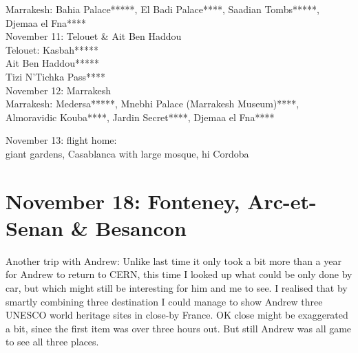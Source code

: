 Marrakesh: Bahia Palace*****, El Badi Palace****, Saadian Tombs*****, Djemaa el Fna****\\

November 11: Telouet \& Ait Ben Haddou\\
Telouet: Kasbah*****\\
Ait Ben Haddou*****\\
Tizi N'Tichka Pass****\\

November 12: Marrakesh\\
Marrakesh: Medersa*****, Mnebhi Palace (Marrakesh Museum)****, Almoravidic Kouba****, Jardin Secret****, Djemaa el Fna****

November 13: flight home:\\
giant gardens, Casablanca with large mosque, hi Cordoba

\section{November 18: Fonteney, Arc-et-Senan \& Besancon}
\label{Nov18}

Another trip with Andrew: Unlike last time it only took a bit more than a year for Andrew to return to CERN, this time I looked up what could be only done by car, but which might still be interesting for him and me to see. I realised that by smartly combining three destination I could manage to show Andrew three UNESCO world heritage sites in close-by France. OK close might be exaggerated a bit, since the first item was over three hours out. But still Andrew was all game to see all three places.\\

